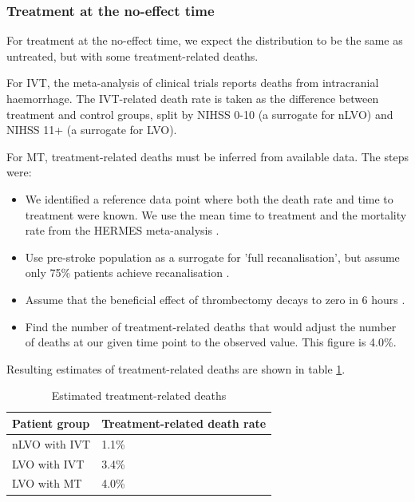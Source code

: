 \subsubsection{Treatment at the no-effect time}

For treatment at the no-effect time, we expect the distribution to be the same as untreated, but with some treatment-related deaths.

For IVT, the meta-analysis of clinical trials \cite{emberson_effect_2014} reports deaths from intracranial haemorrhage. The IVT-related death rate is taken as the difference between treatment and control groups, split by NIHSS 0-10 (a surrogate for nLVO) and NIHSS 11+ (a surrogate for LVO).

For MT, treatment-related deaths must be inferred from available data. The steps were:

\begin{itemize}
    \item We identified a reference data point where both the death rate and time to treatment were known. We use the mean time to treatment and the mortality rate from the HERMES meta-analysis \cite{goyal_endovascular_2016}.
    \item Use pre-stroke population as a surrogate for 'full recanalisation', but assume only 75\% patients achieve recanalisation \cite{hui_efficacy_2020}.
    \item Assume that the beneficial effect of thrombectomy decays to zero in 6 hours \cite{fransen_time_2016}.
    \item Find the number of treatment-related deaths that would adjust the number of deaths at our given time point to the observed value. This figure is 4.0\%.
\end{itemize}


Resulting estimates of treatment-related deaths are shown in table \ref{tab:treatment_deaths}.  



\begin{table}[h!]
    \centering
    \caption{Estimated treatment-related deaths}
    \begin{tabular}{l l}
    Patient group & Treatment-related death rate\\
    \hline
    nLVO with IVT & 1.1\%\\
    LVO with IVT & 3.4\%\\
    LVO with MT & 4.0\%\\
    \end{tabular}
    \label{tab:treatment_deaths}
\end{table}

